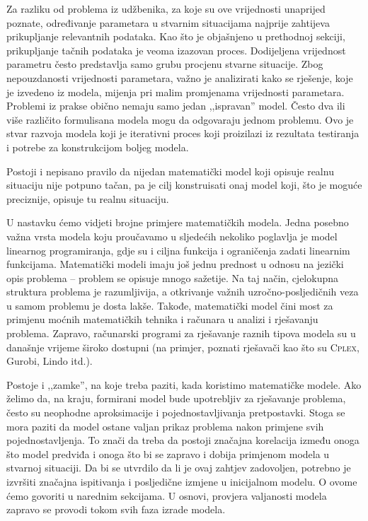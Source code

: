 \documentclass[b5paper, utf8, 11pt, colorlinks]{book}
\theoremstyle{definition}
\begin{document}
 Za razliku od problema iz udžbenika, za koje su ove vrijednosti unaprijed poznate,   određivanje parametara u stvarnim situacijama najprije zahtijeva prikupljanje relevantnih podataka. Kao što je objašnjeno u prethodnoj sekciji,  prikupljanje tačnih podataka je veoma izazovan proces. Dodijeljena vrijednost parametru često predstavlja  samo grubu procjenu stvarne situacije. Zbog nepouzdanosti vrijednosti parametara, važno je analizirati kako se rješenje, koje je izvedeno iz modela, mijenja pri malim promjenama vrijednosti parametara. 
  Problemi iz prakse obično nemaju samo jedan ,,ispravan'' model. Često   dva ili više   različito formulisana modela mogu da odgovaraju jednom problemu. 
 Ovo je stvar razvoja modela koji je iterativni proces koji proizilazi iz rezultata testiranja i potrebe za konstrukcijom boljeg modela.

  Postoji i nepisano pravilo da nijedan matematički model koji opisuje realnu situaciju nije potpuno tačan, pa je cilj konstruisati onaj model koji,  što je moguće preciznije, opisuje tu realnu situaciju.


  U nastavku  ćemo vidjeti brojne primjere matematičkih modela. Jedna posebno važna vrsta modela koju proučavamo u sljedećih nekoliko poglavlja
 je model linearnog programiranja, gdje su i ciljna funkcija i ograničenja zadati linearnim funkcijama. 
  Matematički modeli imaju još jednu prednost u odnosu na jezički opis problema -- problem se opisuje mnogo sažetije. Na taj način, cjelokupna struktura problema je razumljivija, a otkrivanje važnih uzročno-posljedičnih veza u samom problemu je dosta lakše. Takođe, matematički
  model čini most za primjenu moćnih matematičkih tehnika i računara u
 analizi i rješavanju problema. Zapravo, računarski programi za rješavanje raznih tipova modela su  u današnje vrijeme  široko dostupni (na primjer, poznati rješavači kao što su \textsc{Cplex}, Gurobi, Lindo itd.). 

  Postoje i ,,zamke'', na koje treba paziti, kada koristimo matematičke modele. Ako želimo da, na kraju, formirani model bude upotrebljiv za rješavanje problema, često  su neophodne aproksimacije i pojednostavljivanja pretpostavki. Stoga se mora paziti da model ostane valjan prikaz problema nakon primjene svih pojednostavljenja. To znači da treba da postoji značajna korelacija između onoga što model predviđa i onoga što bi se zapravo i dobija primjenom modela u stvarnoj situaciji. Da bi se utvrdilo da li je ovaj zahtjev zadovoljen, potrebno je izvršiti značajna ispitivanja i posljedične izmjene u inicijalnom modelu. O ovome ćemo govoriti u narednim sekcijama. U osnovi, provjera valjanosti modela zapravo se provodi tokom svih  faza izrade modela. 
  
\end{document}
